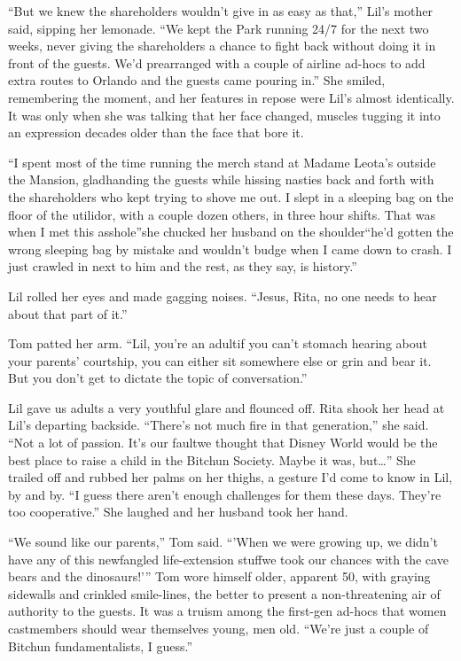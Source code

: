 “But we knew the shareholders wouldn't give in as easy as that,”
Lil's mother said, sipping her lemonade. “We kept the Park running
24/7 for the next two weeks, never giving the shareholders a chance
to fight back without doing it in front of the guests. We'd
prearranged with a couple of airline ad-hocs to add extra routes to
Orlando and the guests came pouring in.” She smiled, remembering
the moment, and her features in repose were Lil's almost
identically. It was only when she was talking that her face
changed, muscles tugging it into an expression decades older than
the face that bore it.

“I spent most of the time running the merch stand at Madame Leota's
outside the Mansion, gladhanding the guests while hissing nasties
back and forth with the shareholders who kept trying to shove me
out. I slept in a sleeping bag on the floor of the utilidor, with a
couple dozen others, in three hour shifts. That was when I met this
asshole”{\dash}she chucked her husband on the shoulder{\dash}“he'd gotten the
wrong sleeping bag by mistake and wouldn't budge when I came down
to crash. I just crawled in next to him and the rest, as they say,
is history.”

Lil rolled her eyes and made gagging noises. “Jesus, Rita, no one
needs to hear about that part of it.”

Tom patted her arm. “Lil, you're an adult{\dash}if you can't stomach
hearing about your parents' courtship, you can either sit somewhere
else or grin and bear it. But you don't get to dictate the topic of
conversation.”

Lil gave us adults a very youthful glare and flounced off. Rita
shook her head at Lil's departing backside. “There's not much fire
in that generation,” she said. “Not a lot of passion. It's our
fault{\dash}we thought that Disney World would be the best place to raise
a child in the Bitchun Society. Maybe it was, but…” She trailed off
and rubbed her palms on her thighs, a gesture I'd come to know in
Lil, by and by. “I guess there aren't enough challenges for them
these days. They're too cooperative.” She laughed and her husband
took her hand.

“We sound like our parents,” Tom said. “'When we were growing up,
we didn't have any of this newfangled life-extension stuff{\dash}we took
our chances with the cave bears and the dinosaurs!'” Tom wore
himself older, apparent 50, with graying sidewalls and crinkled
smile-lines, the better to present a non-threatening air of
authority to the guests. It was a truism among the first-gen
ad-hocs that women castmembers should wear themselves young, men
old. “We're just a couple of Bitchun fundamentalists, I guess.”

